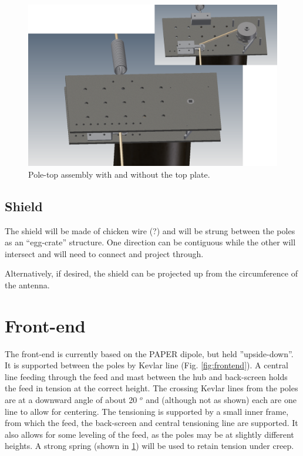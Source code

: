 \documentclass[11pt]{article}
\begin{document}
\begin{figure}[H]
\centering
\includegraphics[width=\textwidth]{plots/poletop.png}
\caption{Pole-top assembly with and without the top plate.}
\label{fig:poletop}
\end{figure}

\subsection{Shield}
The shield will be made of chicken wire (?) and will be strung between the poles as an “egg-crate” structure.  One direction can be contiguous while the other will intersect and will need to connect and project through.

Alternatively, if desired, the shield can be projected up from the circumference of the antenna.

\section{Front-end}
The front-end is currently based on the PAPER dipole, but held ''upside-down''.  It is supported between the poles by Kevlar line (Fig. \ref{fig:frontend}).  A central line feeding through the feed and mast between the hub and back-screen holds the feed in tension at the correct height.  The crossing Kevlar lines from the poles are at a downward angle of about 20 $^o$ and (although not as shown) each are one line to allow for centering.  The tensioning is supported by a small inner frame, from which the feed, the back-screen and central tensioning line are supported.  It also allows for some leveling of the feed, as the poles may be at slightly different heights.   A strong spring (shown in \ref{fig:poletop}) will be used to retain tension under creep.
\end{document}

